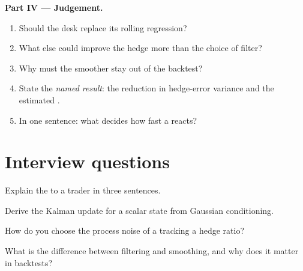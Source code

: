 \begin{problem}
\medskip\noindent\textbf{Part IV --- Judgement.}
\begin{enumerate}[resume]
\item Should the desk replace its rolling regression?
\item What else could improve the hedge more than the choice of filter?
\item Why must the smoother stay out of the backtest?
\item State the \emph{named result}: the reduction in hedge-error variance and the estimated .
\item In one sentence: what decides how fast a  reacts?
\end{enumerate}
\end{problem}

\section{Interview questions}

\begin{interviewq}\label{iq:qm:state-space-models-and-the-kalman-filter:1}
Explain the  to a trader in three sentences.
\end{interviewq}

\begin{interviewq}\label{iq:qm:state-space-models-and-the-kalman-filter:2}
Derive the Kalman update for a scalar state from Gaussian conditioning.
\end{interviewq}

\begin{interviewq}\label{iq:qm:state-space-models-and-the-kalman-filter:3}
How do you choose the process noise of a  tracking a hedge ratio?
\end{interviewq}

\begin{interviewq}\label{iq:qm:state-space-models-and-the-kalman-filter:4}
What is the difference between filtering and smoothing, and why does it matter in backtests?
\end{interviewq}

